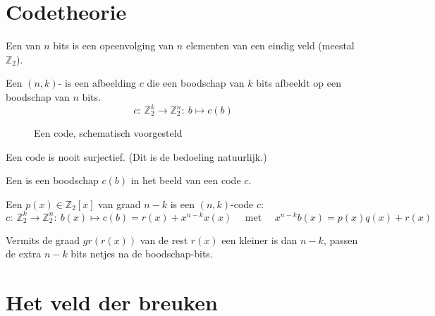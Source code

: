 \documentclass[main.tex]{subfiles}
\begin{document}
\section{Codetheorie}
\label{sec:codetheorie}

\begin{de}
  Een  van $n$ bits is een opeenvolging van $n$ elementen van een eindig veld (meestal $\mathbb{Z}_{2}$).
\end{de}

\begin{de}
  \label{de:code}
  Een $(n,k)$- is een afbeelding $c$ die een boodschap van $k$ bits afbeeldt op een boodschap van $n$ bits.
  \[ c:\ \mathbb{Z}_{2}^{k} \rightarrow \mathbb{Z}_{2}^{n}:\ b \mapsto c(b) \]

  \begin{figure}[H]
    \centering
    \caption{Een code, schematisch voorgesteld}
    \label{fig:code}
  \end{figure}
\end{de}

\begin{opm}
  Een code is nooit surjectief. (Dit is de bedoeling natuurlijk.)
\end{opm}

\begin{de}
  Een  is een boodschap $c(b)$ in het beeld van een code $c$.
\end{de}

\begin{de}
  Een  $p(x)\in \mathbb{Z}_{2}[x]$ van graad $n-k$ is een $(n,k)$-code $c$:
  \[ c:\ \mathbb{Z}_{2}^{k} \rightarrow \mathbb{Z}_{2}^{n}:\ b(x) \mapsto c(b) = r(x) + x^{n-k}x(x) \quad\text{ met }\quad x^{n-k}b(x) = p(x)q(x) + r(x) \]
\end{de}

\begin{opm}
  Vermits de graad $gr(r(x))$ van de rest $r(x)$ een kleiner is dan $n-k$, passen de extra $n-k$ bits netjes na de boodschap-bits.
\end{opm}



\section{Het veld der breuken}
\label{sec:het-veld-der}
\end{document}

